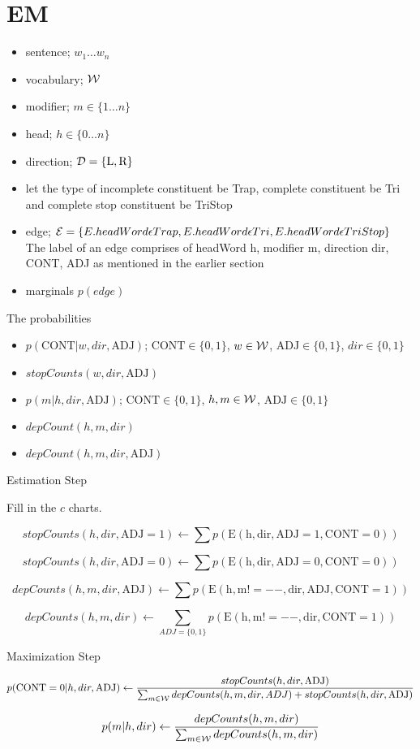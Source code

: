 \documentclass{article}
\begin{document}
\section{EM}


\begin{itemize}
\item sentence; $w_1 \ldots w_n$
\item vocabulary; ${\cal W}$
\item modifier; $m \in \{1 \ldots n\}$
\item head; $h \in \{0 \ldots n\}$
\item direction; ${\cal D}= \{\textrm{L}, \textrm{R}\}$
\item let the type of incomplete constituent be Trap, complete constituent be Tri and complete stop constituent be TriStop
\item edge; ${\cal E}= \{E.headWord \epsilon Trap, E.headWord \epsilon Tri, E.headWord \epsilon TriStop\}$
The label of an edge comprises of headWord h, modifier m, direction dir, CONT, ADJ as mentioned in the earlier section
\item marginals $p(edge)$
\end{itemize}


The probabilities 

\begin{itemize}
\item $p(\mathrm{CONT} | w, dir, \mathrm{ADJ})$; $\mathrm{CONT} \in \{0, 1\}$,  $w \in {\cal W}$, $\mathrm{ADJ} \in \{0, 1\}$, $dir \in \{0,1\}$
\item $stopCounts(w, dir, \mathrm{ADJ})$
\item $p(m | h, dir, \mathrm{ADJ})$; $\mathrm{CONT} \in \{0, 1\}$,  $h, m \in {\cal W}$, $\mathrm{ADJ} \in \{0, 1\}$
\item $depCount(h, m, dir)$
\item $depCount(h, m, dir, \mathrm{ADJ})$

\end{itemize}



Estimation Step


Fill in the $c$ charts. 

 \[stopCounts(h, dir, \mathrm{ADJ}= 1) \gets 
  \sum p(\mathrm{E(h, dir, ADJ=1, CONT = 0)}) \]

 \[stopCounts(h, dir, \mathrm{ADJ}= 0) \gets 
  \sum p(\mathrm{E(h, dir, ADJ=0, CONT = 0)}) \]

\[depCounts(h, m, dir, \mathrm{ADJ}) \gets \sum p(\mathrm{E(h, m!=--, dir, ADJ, CONT = 1)}) \]

\[depCounts(h, m, dir) \gets \sum\limits_{ADJ=\{0,1\}} p(\mathrm{E(h, m!=--, dir, CONT = 1)}) \]

Maximization Step

  \[p(\mathrm{CONT}=0 | h, dir, \mathrm{ADJ}) \gets 
  \frac{stopCounts(h, dir, \mathrm{ADJ})}{
    \sum_{m \in {\cal W}} depCounts(h, m, dir, ADJ) + stopCounts(h, dir, \mathrm{ADJ})} 
  \]

  \[p(m | h, dir) \gets 
  \frac{depCounts(h, m, dir)}{
    \sum_{m \in {\cal W}} depCounts(h, m, dir)}
  \]
\end{document}
